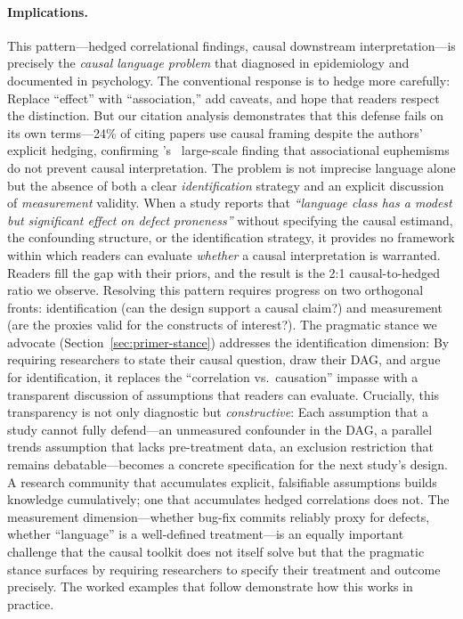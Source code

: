 \paragraph{Implications.}
This pattern---hedged correlational findings, causal downstream interpretation---is precisely the \emph{causal language problem} that \citet{hernan2018cword} diagnosed in epidemiology and \citet{grosz2020taboo} documented in psychology.
The conventional response is to hedge more carefully: Replace ``effect'' with ``association,'' add caveats, and hope that readers respect the distinction.
But our citation analysis demonstrates that this defense fails on its own terms---24\% of citing papers use causal framing despite the authors' explicit hedging, confirming \citeauthor{haber2022causal}'s~\cite{haber2022causal} large-scale finding that associational euphemisms do not prevent causal interpretation.
The problem is not imprecise language alone but the absence of both a clear \emph{identification} strategy and an explicit discussion of \emph{measurement} validity.
When a study reports that \emph{``language class has a modest but significant effect on defect proneness''} without specifying the causal estimand, the confounding structure, or the identification strategy, it provides no framework within which readers can evaluate \emph{whether} a causal interpretation is warranted.
Readers fill the gap with their priors, and the result is the 2:1 causal-to-hedged ratio we observe.
Resolving this pattern requires progress on two orthogonal fronts: identification (can the design support a causal claim?) and measurement (are the proxies valid for the constructs of interest?).
The pragmatic stance we advocate (Section~\ref{sec:primer-stance}) addresses the identification dimension: By requiring researchers to state their causal question, draw their DAG, and argue for identification, it replaces the ``correlation vs.\ causation'' impasse with a transparent discussion of assumptions that readers can evaluate.
Crucially, this transparency is not only diagnostic but \emph{constructive}: Each assumption that a study cannot fully defend---an unmeasured confounder in the DAG, a parallel trends assumption that lacks pre-treatment data, an exclusion restriction that remains debatable---becomes a concrete specification for the next study's design.
A research community that accumulates explicit, falsifiable assumptions builds knowledge cumulatively; one that accumulates hedged correlations does not.
The measurement dimension---whether bug-fix commits reliably proxy for defects, whether ``language'' is a well-defined treatment---is an equally important challenge that the causal toolkit does not itself solve but that the pragmatic stance surfaces by requiring researchers to specify their treatment and outcome precisely.
The worked examples that follow demonstrate how this works in practice.

